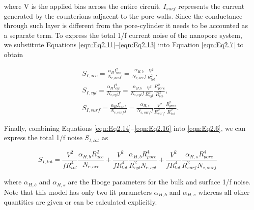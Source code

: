 \noindent where V is the applied bias across the entire circuit. $I_{surf}$ represents the current generated by the counterions adjacent to the pore walls. Since the conductance through such layer is different from the pore-cylinder it needs to be accounted as a separate term. To express the total 1/f current noise of the nanopore system, we substitute Equations \ref{eqn:Eq2.11}–\ref{eqn:Eq2.13} into Equation \ref{eqn:Eq2.7} to obtain



 \begin{align}
\label{eqn:Eq2.14}
&S_{I,acc}=\frac{\alpha_H I_{acc}^2}{N_{c,acc}f}=
\frac{\alpha_{H,b}}{N_{c,acc}f}\frac{V^2}{R_{tot}^2},\\
\label{eqn:Eq2.15}
&S_{I,cyl}=\frac{\alpha_H I_{cyl}^2}{N_{c,cyl}f}=
\frac{\alpha_{H,b}}{N_{c,cyl}f}\frac{V^2}{R_{cyl}^2}
\frac{R_{pore}^2}{R_{tot}^2},\\ 
\label{eqn:Eq2.16}
&S_{I,surf}=\frac{\alpha_H I_{surf}^2}{N_{c,surf}f}=
\frac{\alpha_{H,s}}{N_{c,surf}f}\frac{V^2}{R_{surf}^2}
\frac{R_{pore}^2}{R_{tot}^2}.
\end{align}

\noindent Finally, combining Equations \ref{eqn:Eq2.14}–\ref{eqn:Eq2.16} into \ref{eqn:Eq2.6}, we can express the total 1/f noise $S_{I,tot}$ as

\begin{equation}\label{eqn:Eq2.17}
	S_{I,tot}=
	\frac{V^2}{fR_{tot}^4}\frac{\alpha_{H,b} R_{acc}^2}{N_{c,acc}}+
	\frac{V^2}{fR_{tot}^4}\frac{\alpha_{H,b} R_{pore}^4}{R_{cyl}^2N_{c,cyl}}+
	\frac{V^2}{fR_{tot}^4}\frac{\alpha_{H,s} R_{pore}^4}{R_{surf}^2N_{c,surf}}
\end{equation}


\noindent where $\alpha_{H,b}$ and $\alpha_{H,s}$ are the Hooge parameters for the bulk and surface 1/f noise. Note that this model has only two fit parameters $\alpha_{H,b}$ and $\alpha_{H,s}$ whereas all other quantities are given or can be calculated explicitly. 


